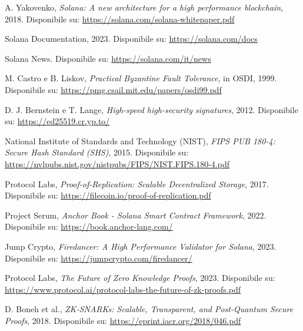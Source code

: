 \documentclass[a4paper,12pt]{report}
\begin{document}
	\begin{thebibliography}{99}
		A. Yakovenko, \emph{Solana: A new architecture for a high performance blockchain}, 2018. Disponibile su: \url{https://solana.com/solana-whitepaper.pdf}
		
		Solana Documentation, 2023. Disponibile su:
		\url{https://solana.com/docs}
		
		Solana News. Disponibile su:
		\url{https://solana.com/it/news}
		
		M. Castro e B. Liskov, \emph{Practical Byzantine Fault Tolerance}, in OSDI, 1999. Disponibile su: \url{https://pmg.csail.mit.edu/papers/osdi99.pdf}
		
		D. J. Bernstein e T. Lange, \emph{High-speed high-security signatures}, 2012. Disponibile su: \url{https://ed25519.cr.yp.to/}
		
		National Institute of Standards and Technology (NIST), \emph{FIPS PUB 180-4: Secure Hash Standard (SHS)}, 2015. Disponibile su: \url{https://nvlpubs.nist.gov/nistpubs/FIPS/NIST.FIPS.180-4.pdf}
		
		Protocol Labs, \emph{Proof-of-Replication: Scalable Decentralized Storage}, 2017. Disponibile su: \url{https://filecoin.io/proof-of-replication.pdf}
		
		Project Serum, \emph{Anchor Book - Solana Smart Contract Framework}, 2022. Disponibile su: \url{https://book.anchor-lang.com/}
		
		Jump Crypto, \emph{Firedancer: A High Performance Validator for Solana}, 2023. Disponibile su: \url{https://jumpcrypto.com/firedancer/}
		
		Protocol Labs, \emph{The Future of Zero Knowledge Proofs}, 2023. Disponibile su: \url{https://www.protocol.ai/protocol-labs-the-future-of-zk-proofs.pdf}
		
		D. Boneh et al., \emph{ZK-SNARKs: Scalable, Transparent, and Post-Quantum Secure Proofs}, 2018. Disponibile su: \url{https://eprint.iacr.org/2018/046.pdf}
		
	\end{thebibliography}
	
\end{document}
